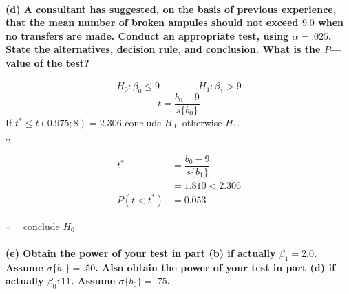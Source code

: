 \documentclass[]{article}
\let\oldparagraph\paragraph
\renewcommand{\paragraph}[1]{\oldparagraph{#1}\mbox{}}
\begin{document}
\paragraph{\texorpdfstring{(d) A consultant has suggested, on the basis
of previous experience, that the mean number of broken ampules should
not exceed \(9.0\) when no transfers are made. Conduct an appropriate
test, using \(\alpha = .025\). State the alternatives, decision rule,
and conclusion. What is the \(P\)---value of the
test?}{(d) A consultant has suggested, on the basis of previous experience, that the mean number of broken ampules should not exceed 9.0 when no transfers are made. Conduct an appropriate test, using \textbackslash{}alpha = .025. State the alternatives, decision rule, and conclusion. What is the P---value of the test?}}\label{d-a-consultant-has-suggested-on-the-basis-of-previous-experience-that-the-mean-number-of-broken-ampules-should-not-exceed-9.0-when-no-transfers-are-made.-conduct-an-appropriate-test-using-alpha-.025.-state-the-alternatives-decision-rule-and-conclusion.-what-is-the-pvalue-of-the-test}

\[H_0:\beta_0\leqslant 9\qquad\qquad H_1:\beta_1>9\]
\[t=\dfrac{b_0-9}{s\{b_0\}}\] If \(t^*\leqslant t(0.975;8)=2.306\)
conclude \(H_0\), otherwise \(H_1\).

\(\because\quad\)

\begin{align*}
t^*&=\dfrac{b_0-9}{s\{b_1\}}\\
&=1.810<2.306\\
P(t<t^*)&=0.053
\end{align*}

\(\therefore\quad\) conclude \(H_0\)

\paragraph{\texorpdfstring{(e) Obtain the power of your test in part (b)
if actually \(\beta_1 = 2.0\). Assume \(\sigma\{b_1\} =.50\). Also
obtain the power of your test in part (d) if actually \(\beta_0: 11\).
Assume
\(\sigma\{b_0\} = .75\).}{(e) Obtain the power of your test in part (b) if actually \textbackslash{}beta\_1 = 2.0. Assume \textbackslash{}sigma\textbackslash{}\{b\_1\textbackslash{}\} =.50. Also obtain the power of your test in part (d) if actually \textbackslash{}beta\_0: 11. Assume \textbackslash{}sigma\textbackslash{}\{b\_0\textbackslash{}\} = .75.}}\label{e-obtain-the-power-of-your-test-in-part-b-if-actually-beta_1-2.0.-assume-sigmab_1-.50.-also-obtain-the-power-of-your-test-in-part-d-if-actually-beta_0-11.-assume-sigmab_0-.75.}
\end{document}
